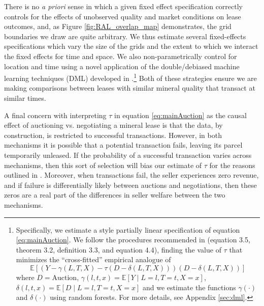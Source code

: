 There is no \textit{a priori} sense in which a given fixed effect specification correctly controls for the effects of unobserved quality and market conditions on lease outcomes, and, as Figure \ref{fig:RAL_overlap_map} demonstrates, the grid boundaries we draw are quite arbitrary. We thus estimate several fixed-effects specifications which vary the size of the grids and the extent to which we interact the fixed effects for time and space. We also non-parametrically control for location and time using a novel application of the double/debiased machine learning techniques (DML) developed in \cite{chernozhukov2018double}.\footnote{Specifically, we estimate a \cite{robinson1988root} style partially linear specification of equation \ref{eq:mainAuction}.  We follow the procedures recommended in \cite{chernozhukov2018double} (equation 3.5, theorem 3.2, definition 3.3, and equation 4.4), finding the value of $\tau$ that minimizes the ``cross-fitted'' empirical analogue of 
\begin{equation*}
	\mathbb{E}\left[\left(Y - \gamma(L,T,X) - \tau(D - \delta(L,T,X))\right)\left(D - \delta(L,T,X)\right)\right]
\end{equation*}
where $D = \text{Auction}$, $\gamma(l,t,x) = \mathbb{E}\left[Y\mid L = l, T = t, X = x\right]$, $\delta(l,t,x) = \mathbb{E}\left[D\mid L = l, T = t, X = x\right]$ and we estimate the functions $\gamma(\cdot)$ and $\delta(\cdot)$ using random forests.  For more details, see Appendix \ref{sec:dml}.} Both of these strategies ensure we are making comparisons between leases with similar mineral quality that transact at similar times. 

A final concern with interpreting $\tau$ in equation \ref{eq:mainAuction} as the causal effect of auctioning vs. negotiating a mineral lease is that the data, by construction, is restricted to successful transactions. However, in both mechanisms it is possible that a potential transaction fails, leaving its parcel temporarily unleased. If the probability of a successful transaction varies across mechanisms, then this sort of selection will bias our estimate of $\tau$ for the reasons outlined in \cite{heckman1979sample}. Moreover, when transactions fail, the seller experiences zero revenue, and if failure is differentially likely between auctions and negotiations, then these zeros are a real part of the differences in seller welfare between the two mechanisms. 


